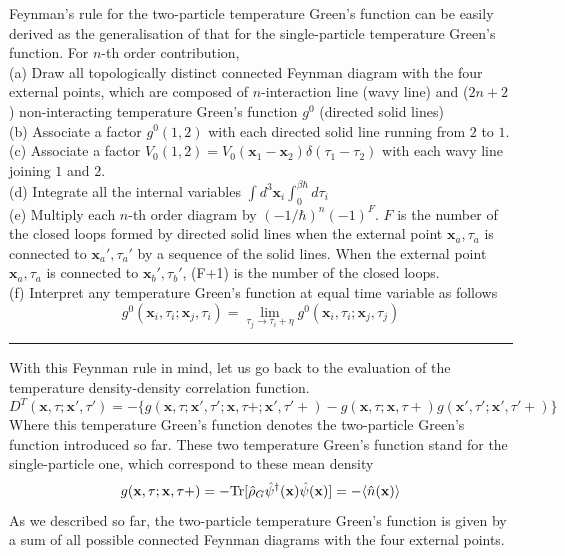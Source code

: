  Feynman's rule for the two-particle temperature Green's function can be easily derived as the generalisation of that for the single-particle temperature Green's function.
 For $n$-th order contribution,\\
(a) Draw all topologically distinct connected Feynman diagram with the four external points, which are composed of $n$-interaction line (wavy line) and ($2n+2$) non-interacting temperature Green's function $g^0$ (directed solid lines)\\
(b) Associate a factor $g^0(1,2)$ with each directed solid line running from $2$ to $1$.\\
(c) Associate a factor $V_0(1,2)=V_0(\mathbf x_1-\mathbf x_2)\delta(\tau_1-\tau_2)$ with each wavy line joining $1$ and $2$.\\
(d) Integrate all the internal variables $\int d^3\mathbf x_i\int_0^{\beta\hbar}d\tau_i$\\
(e) Multiply each $n$-th order diagram by $(-1/\hbar)^n(-1)^F$. $F$ is the number of the closed loops formed by directed solid lines when the external point $\mathbf x_a,\tau_a$ is connected to $\mathbf x_a',\tau_a'$ by a sequence of the solid lines.
When the external point $\mathbf x_a,\tau_a$ is connected to $\mathbf x_b',\tau_b'$, (F+1) is the number of the closed loops.\\
(f) Interpret any temperature Green's function at equal time variable as follows 
\[
g^0(\mathbf x_i,\tau_i;\mathbf x_j,\tau_i)=\lim_{\tau_j\to \tau_i+\eta}g^0(\mathbf x_i,\tau_i;\mathbf x_j,\tau_j)
\]
\rule{\textwidth}{0.1mm}
With this Feynman rule in mind, let us go back to the evaluation of the temperature density-density correlation function.
\begin{equation}
D^T(\mathbf x,\tau;\mathbf x',\tau')=-\{ g(\mathbf x,\tau;\mathbf x',\tau';\mathbf x,\tau+;\mathbf x',\tau'+)-g(\mathbf x,\tau;\mathbf x,\tau+)g(\mathbf x',\tau';\mathbf x',\tau'+) \}
\end{equation}
 Where this temperature Green's function denotes the two-particle Green's function introduced so far.
 These two temperature Green's function stand for the single-particle one, which correspond to these mean density
\begin{equation}
g(\mathbf x,\tau;\mathbf x,\tau+)=-\text{Tr}[\hat \rho_G\hat \psi^\dag(\mathbf x)\hat \psi(\mathbf x)]=-\langle \hat n(\mathbf x)\rangle
\end{equation}
 As we described so far, the two-particle temperature Green's function is given by a sum of all possible connected Feynman diagrams with the four external points.\\
